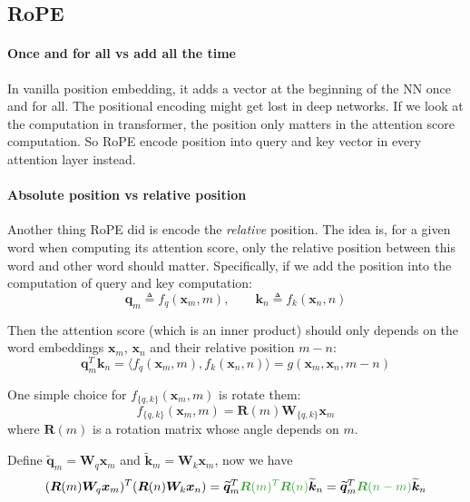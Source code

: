 \documentclass{article}
\begin{document}
\subsection{RoPE}


\paragraph{Once and for all vs add all the time}
In vanilla position embedding, it adds a vector at the beginning of the NN once and for all.
The positional encoding might get lost in deep networks.
If we look at the computation in transformer, the position only matters in the attention score computation.
So RoPE encode position into query and key vector in every attention layer instead.

\paragraph{Absolute position vs relative position}

Another thing RoPE did is encode the \textit{relative} position. 
The idea is, for a given word when computing its attention score, only the relative position between this word and other word should matter.
Specifically, if we add the position into the computation of query and key computation:
\[
\boldsymbol{q}_m \triangleq f_q(\boldsymbol{x}_m, m), \qquad  \boldsymbol{k}_n \triangleq f_k(\boldsymbol{x}_n, n)
\]

Then the attention score (which is an inner product) should only depends on the word embeddings $\boldsymbol{x}_m$, $\boldsymbol{x}_n$ and their relative position $m-n$:
\[
\boldsymbol{q}_m^{T} \boldsymbol{k}_n = \langle f_q(\boldsymbol{x}_m, m), f_k(\boldsymbol{x}_n, n) \rangle = g(\boldsymbol{x}_m, \boldsymbol{x}_n, m-n)
\]

One simple choice for $f_{\{q, k\}}(\boldsymbol{x}_m, m)$ is rotate them:
\[
f_{\{q, k\}}(\boldsymbol{x}_m, m) = \boldsymbol{R}(m) \boldsymbol{W}_{\{q, k\}} \boldsymbol{x}_m
\]
where $\boldsymbol{R}(m)$ is a rotation matrix whose angle depends on $m$.

Define $\widetilde{\boldsymbol{q}}_m =\boldsymbol{W}_q \boldsymbol{x}_m$ and $\widetilde{\boldsymbol{k}}_m =\boldsymbol{W}_k \boldsymbol{x}_m$, now we have
\[
(\boldsymbol{R}(m) \boldsymbol{W}_q \boldsymbol{x}_m)^{T} (\boldsymbol{R}(n) \boldsymbol{W}_k \boldsymbol{x}_n) = \widetilde{\boldsymbol{q}}_m^T \textcolor{mygreen}{\boldsymbol{R}(m)^T \boldsymbol{R}(n)} \widetilde{\boldsymbol{k}}_n = \widetilde{\boldsymbol{q}}_m^T \textcolor{mygreen}{\boldsymbol{R}(n-m)} \widetilde{\boldsymbol{k}}_n 
\]
\end{document}
